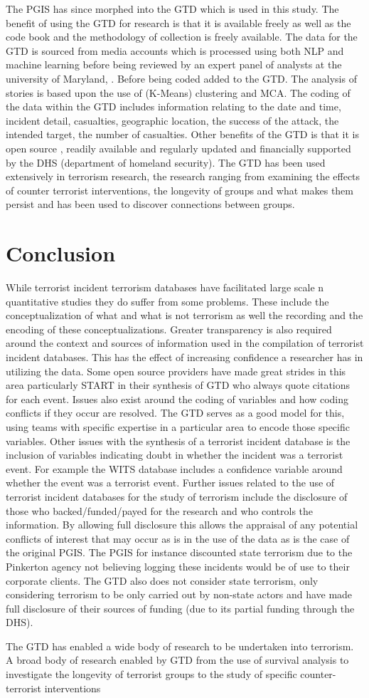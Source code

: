 The PGIS has since morphed into the GTD which is used in this study. The benefit of using the GTD for research is that it is available freely as well as the code book and the methodology of collection is freely available. The data for the GTD is sourced from media accounts which is processed using both NLP and machine learning before being reviewed by an expert panel of analysts at the university of Maryland, \citep{fivethirtyeightGTD2015}. Before being coded added to the GTD. The analysis of stories is based upon the use of (K-Means) clustering and MCA. The coding of the data within the GTD includes information relating to the date and time, incident detail, casualties, geographic location, the success of the attack, the intended target, the number of casualties. Other benefits of the GTD is that it is open source , readily available and regularly updated and financially supported by the DHS (department of homeland security). 
The GTD has been used extensively in terrorism research, the research ranging from examining the effects of counter terrorist interventions, the longevity of groups and what makes them persist and  has been used to discover connections between groups.

\section{Conclusion}
While terrorist incident terrorism databases have facilitated large scale n quantitative studies they do suffer from some problems. These include the conceptualization of what and what is not terrorism as well the recording and the encoding of these conceptualizations.  Greater transparency is also required around the context and sources of information used in the compilation of terrorist incident databases. This has the effect of increasing confidence a researcher has in utilizing the data. Some open source providers have made great strides in this area particularly START in their synthesis of GTD who always quote citations for each event. Issues also exist around the coding of variables and how coding conflicts if they occur are resolved. The GTD serves as a good model for this, using teams with specific expertise in a particular area to encode those specific variables. Other issues with the synthesis of a terrorist incident database is the inclusion  of variables indicating doubt in whether the incident was a terrorist event. For example the WITS database includes a confidence variable around whether the event was a terrorist event. Further issues related to the use of terrorist incident databases for the study of terrorism include the disclosure of those who backed/funded/payed for the research and who controls the information. By allowing full disclosure this allows the appraisal of any potential conflicts of interest that may occur as is in the use of the data as is the case of the original PGIS. The PGIS for instance discounted state terrorism due to the Pinkerton agency not believing logging these incidents would be of use to their corporate clients. The GTD also does not consider state terrorism, only considering terrorism to be only carried out by non-state actors and have made full disclosure of their sources of funding (due to its partial funding through the DHS).

The GTD has enabled a wide body of research to be undertaken into terrorism. A broad body of research enabled by GTD from the use of survival analysis to investigate the longevity of terrorist groups to the study of specific counter-terrorist interventions

 
